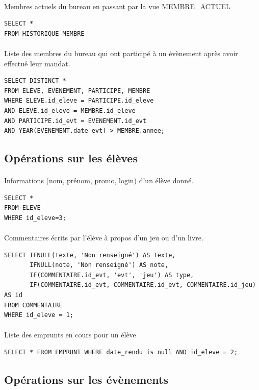 \documentclass[a4paper, 11pt]{article}
\begin{document}
\paragraph{}
Membres actuels du bureau en passant par la vue MEMBRE_ACTUEL
\begin{verbatim}
SELECT *
FROM HISTORIQUE_MEMBRE
\end{verbatim}
\paragraph{}
Liste des membres du bureau qui ont participé à un évènement après avoir effectué leur mandat.
\begin{verbatim}
SELECT DISTINCT *
FROM ELEVE, EVENEMENT, PARTICIPE, MEMBRE
WHERE ELEVE.id_eleve = PARTICIPE.id_eleve
AND ELEVE.id_eleve = MEMBRE.id_eleve
AND PARTICIPE.id_evt = EVENEMENT.id_evt
AND YEAR(EVENEMENT.date_evt) > MEMBRE.annee;
\end{verbatim}
\subsection{Opérations sur les élèves}
\paragraph{}
Informations (nom, prénom, promo, login) d'un élève donné.
\begin{verbatim}
SELECT *
FROM ELEVE 
WHERE id_eleve=3;
\end{verbatim}
\paragraph{}
Commentaires écrits par l'élève à propos d'un jeu ou d'un livre.
\begin{verbatim}
SELECT IFNULL(texte, 'Non renseigné') AS texte,
       IFNULL(note, 'Non renseigné') AS note,
       IF(COMMENTAIRE.id_evt, 'evt', 'jeu') AS type, 
       IF(COMMENTAIRE.id_evt, COMMENTAIRE.id_evt, COMMENTAIRE.id_jeu) AS id
FROM COMMENTAIRE
WHERE id_eleve = 1;
\end{verbatim}
\paragraph{}
Liste des emprunts en cours pour un élève
\begin{verbatim}
SELECT * FROM EMPRUNT WHERE date_rendu is null AND id_eleve = 2;
\end{verbatim}
\subsection{Opérations sur les évènements}
\end{document}
